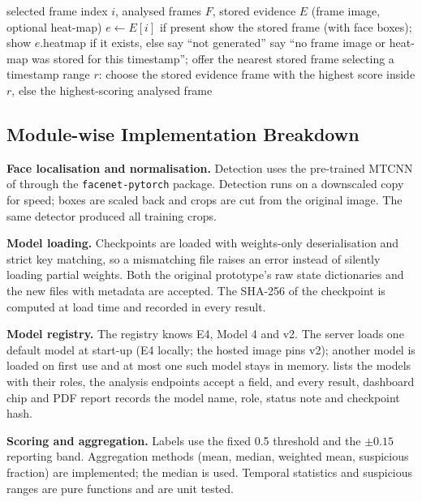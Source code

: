 \begin{algorithm}[ht]
\caption{Selecting what the frame viewer shows}
\label{alg:viewer}
\begin{algorithmic}[1]
\Require selected frame index $i$, analysed frames $F$, stored evidence $E$ (frame image, optional heat-map)
\State $e \gets E[i]$ if present
  \State show the stored frame (with face boxes); show $e$.heatmap if it exists, else say ``not generated''
\Else
  \State say ``no frame image or heat-map was stored for this timestamp''; offer the nearest stored frame 
\EndIf
\State selecting a timestamp range $r$: choose the stored evidence frame with the highest score inside $r$, else the highest-scoring analysed frame
\end{algorithmic}
\end{algorithm}

\subsection{Module-wise Implementation Breakdown}
\textbf{Face localisation and normalisation.} Detection uses the pre-trained MTCNN of \citep{zhang2016mtcnn} through the
\texttt{facenet-pytorch} package. Detection runs on a downscaled copy for speed; boxes are scaled back and crops are cut from the original
image. The same detector produced all training crops.

\textbf{Model loading.} Checkpoints are loaded with weights-only deserialisation and strict key matching, so a mismatching file raises an error instead
of silently loading partial weights. Both the original prototype's raw state dictionaries and the new files with metadata are accepted. The
SHA-256 of the checkpoint is computed at load time and recorded in every result.

\textbf{Model registry.} The registry knows E4, Model 4 and v2. The server loads one default model at start-up (E4 locally; the hosted image pins v2); another model is loaded on first use and at most one such model stays in memory.  lists the models with their roles, the analysis endpoints accept a  field, and every result, dashboard chip and PDF report records the model name, role, status note and checkpoint hash.

\textbf{Scoring and aggregation.} Labels use the fixed 0.5 threshold and the $\pm0.15$ reporting band. Aggregation methods (mean, median,
weighted mean, suspicious fraction) are implemented; the median is used. Temporal statistics and suspicious ranges are pure functions and are unit tested.


